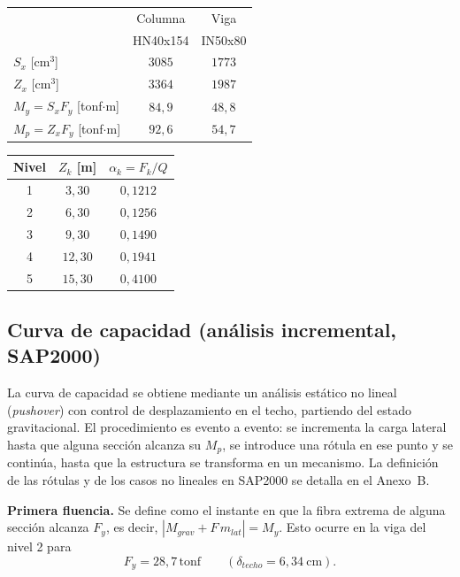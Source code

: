 \documentclass[11pt,letterpaper]{article}
\newcommand{\tonf}{\,\mathrm{tonf}}
\begin{document}
\begin{table}[H]
\centering
\begin{minipage}{0.45\textwidth}
\centering
{}
\begin{tabular}{lcc}
\toprule
 & Columna & Viga \\
 & HN40x154 & IN50x80 \\
\midrule
$S_x$ [cm$^3$] & $3085$ & $1773$ \\
$Z_x$ [cm$^3$] & $3364$ & $1987$ \\
$M_y = S_x F_y$ [tonf$\cdot$m] & $84{,}9$ & $48{,}8$ \\
$M_p = Z_x F_y$ [tonf$\cdot$m] & $92{,}6$ & $54{,}7$ \\
\bottomrule
\end{tabular}
\end{minipage}\hfill
\begin{minipage}{0.45\textwidth}
\centering
{}
\begin{tabular}{ccc}
\toprule
Nivel & $Z_k$ [m] & $\alpha_k = F_k/Q$ \\
\midrule
1 & $3{,}30$ & $0{,}1212$ \\
2 & $6{,}30$ & $0{,}1256$ \\
3 & $9{,}30$ & $0{,}1490$ \\
4 & $12{,}30$ & $0{,}1941$ \\
5 & $15{,}30$ & $0{,}4100$ \\
\bottomrule
\end{tabular}
\end{minipage}
\end{table}

\subsection{Curva de capacidad (análisis incremental, SAP2000)}
La curva de capacidad se obtiene mediante un análisis estático no lineal (\emph{pushover}) con control de
desplazamiento en el techo, partiendo del estado gravitacional. El procedimiento es evento a evento: se
incrementa la carga lateral hasta que alguna sección alcanza su $M_p$, se introduce una rótula en ese punto y se
continúa, hasta que la estructura se transforma en un mecanismo. La definición de las rótulas y de los casos
no lineales en SAP2000 se detalla en el Anexo~B.

\textbf{Primera fluencia.} Se define como el instante en que la fibra extrema de alguna sección alcanza $F_y$, es
decir, $|M_{grav} + F\,m_{lat}| = M_y$. Esto ocurre en la viga del nivel 2 para
\[
F_{y} = 28{,}7\tonf \qquad (\delta_{techo} = 6{,}34\ \mathrm{cm}).
\]
\end{document}
